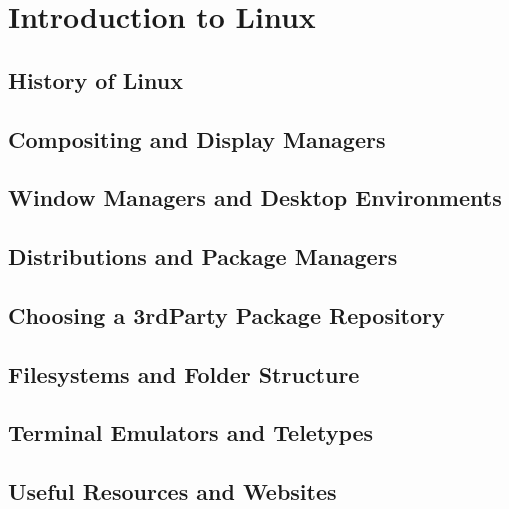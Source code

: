 \chapter{Introduction to Linux}
\localtableofcontents
\clearpage

\section{History of Linux}

\linebreak

\section{Compositing and Display Managers}

\linebreak

\section{Window Managers and Desktop Environments}

\linebreak

\section{Distributions and Package Managers}

\linebreak

\section{Choosing a 3rd\-Party Package Repository}

\linebreak

\section{Filesystems and Folder Structure}

\linebreak

\section{Terminal Emulators and Teletypes}

\linebreak

\section{Useful Resources and Websites}

\linebreak